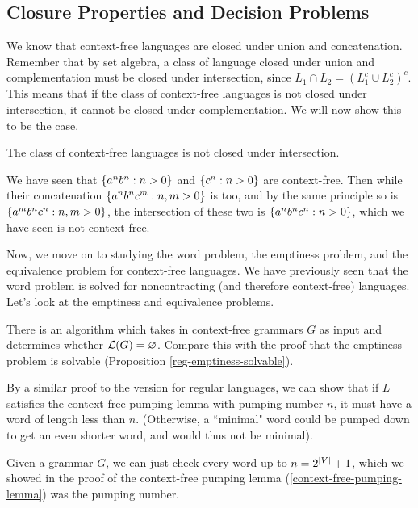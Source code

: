 \documentclass{article}
\begin{document}
\subsection{Closure Properties and Decision Problems}

We know that context-free languages are closed under union and concatenation. Remember that by set algebra, a class of language closed under union and complementation must be closed under intersection, since $L_1 \cap L_2 = (L_1^c \cup L_2^c)^c$. This means that if the class of context-free languages is not closed under intersection, it cannot be closed under complementation. We will now show this to be the case.

\begin{proposition}
	The class of context-free languages is not closed under intersection.
\end{proposition}

\begin{prf}
	We have seen that $\left\lbrace a^n b^n : n > 0 \right\rbrace$ and $\left\lbrace c^n: n > 0 \right\rbrace$ are context-free. Then while their concatenation $\left\lbrace a^n b^n c^m : n, m > 0 \right\rbrace$ is too, and by the same principle so is $\left\lbrace a^m b^n c^n : n, m > 0 \right\rbrace$, the intersection of these two is $\left\lbrace a^n b^n c^n : n > 0 \right\rbrace$, which we have seen is not context-free.
\end{prf}

Now, we move on to studying the word problem, the emptiness problem, and the equivalence problem for context-free languages. We have previously seen that the word problem is solved for noncontracting (and therefore context-free) languages. Let's look at the emptiness and equivalence problems.

\begin{proposition}
	\label{cf-emptiness-solvable}
	There is an algorithm which takes in context-free grammars $G$ as input and determines whether $\mathcal{L}(G) = \varnothing$. Compare this with the proof that the emptiness problem is solvable (Proposition \ref{reg-emptiness-solvable}).
\end{proposition}

\begin{prf}
	By a similar proof to the version for regular languages, we can show that if $L$ satisfies the context-free pumping lemma with pumping number $n$, it must have a word of length less than $n$. (Otherwise, a ``minimal" word could be pumped down to get an even shorter word, and would thus not be minimal).
	    
	Given a grammar $G$, we can just check every word up to $n = 2^{\left\lvert V \right\rvert} + 1$, which we showed in the proof of the context-free pumping lemma (\ref{context-free-pumping-lemma}) was the pumping number.
\end{prf}
\end{document}
